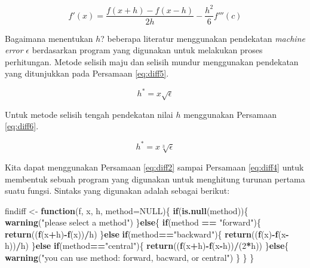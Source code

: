 \documentclass[
]{book}
\newenvironment{Shaded}{\begin{snugshade}}{\end{snugshade}}
\newcommand{\AttributeTok}[1]{\textcolor[rgb]{0.13,0.29,0.53}{#1}}
\newcommand{\ConstantTok}[1]{\textcolor[rgb]{0.56,0.35,0.01}{#1}}
\newcommand{\ControlFlowTok}[1]{\textcolor[rgb]{0.13,0.29,0.53}{\textbf{#1}}}
\newcommand{\DecValTok}[1]{\textcolor[rgb]{0.00,0.00,0.81}{#1}}
\newcommand{\FunctionTok}[1]{\textcolor[rgb]{0.13,0.29,0.53}{\textbf{#1}}}
\newcommand{\NormalTok}[1]{#1}
\newcommand{\OtherTok}[1]{\textcolor[rgb]{0.56,0.35,0.01}{#1}}
\newcommand{\SpecialCharTok}[1]{\textcolor[rgb]{0.81,0.36,0.00}{\textbf{#1}}}
\newcommand{\StringTok}[1]{\textcolor[rgb]{0.31,0.60,0.02}{#1}}
\theoremstyle{definition}
\theoremstyle{definition}
\theoremstyle{definition}
\theoremstyle{definition}
\theoremstyle{remark}
\begin{document}
\begin{equation}
f'\left(x\right) = \frac{f\left(x+h\right)-f\left(x-h\right)}{2h} - \frac{h^2}{6} f'''\left(c\right)
  \label{eq:diff4}
\end{equation}

Bagaimana menentukan \(h\)? beberapa literatur menggunakan pendekatan \emph{machine error} \(\epsilon\) berdasarkan program yang digunakan untuk melakukan proses perhitungan. Metode selisih maju dan selisih mundur menggunakan pendekatan yang ditunjukkan pada Persamaan \eqref{eq:diff5}.

\begin{equation}
h^{\ast}=x\sqrt{\epsilon}
  \label{eq:diff5}
\end{equation}

Untuk metode selisih tengah pendekatan nilai \(h\) menggunakan Persamaan \eqref{eq:diff6}.

\begin{equation}
h^{\ast}=x\sqrt[3]{\epsilon}
  \label{eq:diff6}
\end{equation}

Kita dapat menggunakan Persamaan \eqref{eq:diff2} sampai Persamaan \eqref{eq:diff4} untuk membentuk sebuah program yang digunakan untuk menghitung turunan pertama suatu fungsi. Sintaks yang digunakan adalah sebagai berikut:

\begin{Shaded}
\begin{Highlighting}[]
\NormalTok{findiff }\OtherTok{\textless{}{-}} \ControlFlowTok{function}\NormalTok{(f, x, h, }\AttributeTok{method=}\ConstantTok{NULL}\NormalTok{)\{}
  \ControlFlowTok{if}\NormalTok{(}\FunctionTok{is.null}\NormalTok{(method))\{}
    \FunctionTok{warning}\NormalTok{(}\StringTok{"please select a method"}\NormalTok{)}
\NormalTok{  \}}\ControlFlowTok{else}\NormalTok{\{}
    \ControlFlowTok{if}\NormalTok{(method }\SpecialCharTok{==} \StringTok{"forward"}\NormalTok{)\{}
      \FunctionTok{return}\NormalTok{((}\FunctionTok{f}\NormalTok{(x}\SpecialCharTok{+}\NormalTok{h)}\SpecialCharTok{{-}}\FunctionTok{f}\NormalTok{(x))}\SpecialCharTok{/}\NormalTok{h)}
\NormalTok{    \}}\ControlFlowTok{else} \ControlFlowTok{if}\NormalTok{(method}\SpecialCharTok{==}\StringTok{"backward"}\NormalTok{)\{}
      \FunctionTok{return}\NormalTok{((}\FunctionTok{f}\NormalTok{(x)}\SpecialCharTok{{-}}\FunctionTok{f}\NormalTok{(x}\SpecialCharTok{{-}}\NormalTok{h))}\SpecialCharTok{/}\NormalTok{h)}
\NormalTok{    \}}\ControlFlowTok{else} \ControlFlowTok{if}\NormalTok{(method}\SpecialCharTok{==}\StringTok{"central"}\NormalTok{)\{}
      \FunctionTok{return}\NormalTok{((}\FunctionTok{f}\NormalTok{(x}\SpecialCharTok{+}\NormalTok{h)}\SpecialCharTok{{-}}\FunctionTok{f}\NormalTok{(x}\SpecialCharTok{{-}}\NormalTok{h))}\SpecialCharTok{/}\NormalTok{(}\DecValTok{2}\SpecialCharTok{*}\NormalTok{h))}
\NormalTok{    \}}\ControlFlowTok{else}\NormalTok{\{}
      \FunctionTok{warning}\NormalTok{(}\StringTok{"you can use method: forward, bacward, or central"}\NormalTok{)}
\NormalTok{    \}}
\NormalTok{  \}}
\NormalTok{\}}
\end{Highlighting}
\end{Shaded}
\end{document}
